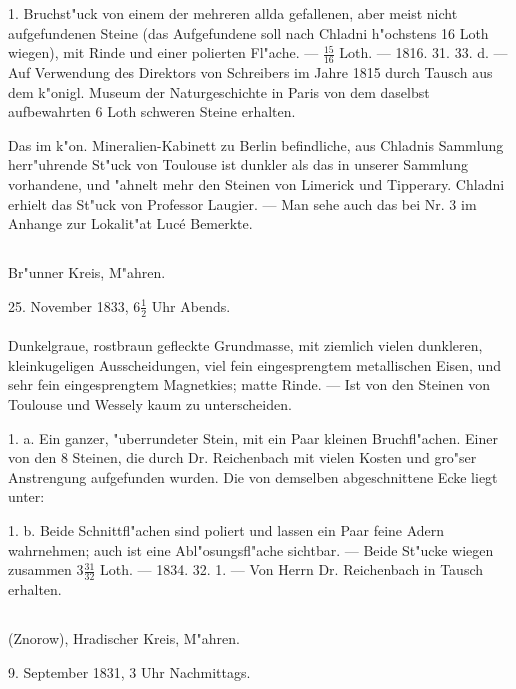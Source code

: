 \documentclass[a4paper, 11pt, oneside, polutonikogreek, german]{article}
\begin{document}
1. Bruchst"uck von einem der mehreren allda gefallenen, aber meist nicht aufgefundenen Steine (das Aufgefundene soll nach Chladni h"ochstens 16 Loth wiegen), mit Rinde und einer polierten Fl"ache. --- $\frac{15}{16}$ Loth. --- 1816. 31. 33. d. --- Auf Verwendung des Direktors von Schreibers im Jahre 1815 durch Tausch aus dem k"onigl. Museum der Naturgeschichte in Paris von dem daselbst aufbewahrten 6 Loth schweren Steine erhalten.

\setlength{\leftskip}{10mm}
\setlength{\parindent}{0pt}

{\footnotesize Das im k"on. Mineralien-Kabinett zu Berlin befindliche, aus Chladnis Sammlung herr"uhrende St"uck von Toulouse ist dunkler als das in unserer Sammlung vorhandene, und "ahnelt mehr den Steinen von Limerick und Tipperary. Chladni erhielt das St"uck von Professor Laugier. --- Man sehe auch das bei Nr. 3 im Anhange zur Lokalit"at Lucé Bemerkte.}

\setlength{\leftskip}{0pt}
\setlength{\parindent}{20pt}

\subsection{}
\begin{center}

Br"unner Kreis, M"ahren.

25. November 1833, $6\frac{1}{2}$ Uhr Abends.
\end{center}
\paragraph{}
Dunkelgraue, rostbraun gefleckte Grundmasse, mit ziemlich vielen dunkleren, kleinkugeligen Ausscheidungen, viel fein eingesprengtem metallischen Eisen, und sehr fein eingesprengtem Magnetkies; matte Rinde. --- Ist von den Steinen von Toulouse und Wessely kaum zu unterscheiden.

1. a. Ein ganzer, "uberrundeter Stein, mit ein Paar kleinen Bruchfl"achen. Einer von den 8 Steinen, die durch Dr. Reichenbach mit vielen Kosten und gro"ser Anstrengung aufgefunden wurden. Die von demselben abgeschnittene Ecke liegt unter:

1. b. Beide Schnittfl"achen sind poliert und lassen ein Paar feine Adern wahrnehmen; auch ist eine Abl"osungsfl"ache sichtbar. --- Beide St"ucke wiegen zusammen $3\frac{31}{32}$ Loth. --- 1834. 32. 1. --- Von Herrn Dr. Reichenbach in Tausch erhalten.
\subsection{}
\begin{center}

(Znorow), Hradischer Kreis, M"ahren.

9. September 1831, 3 Uhr Nachmittags.
\end{center}
\end{document}

